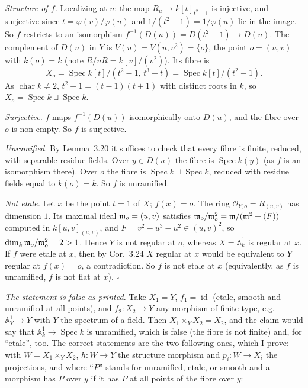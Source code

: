 \documentclass[11pt]{article}
\begin{document}
\emph{Structure of $f$.} Localizing at $u$: the map $R_u\to k[t]_{t^2-1}$ is injective, and surjective since $t=\varphi(v)/\varphi(u)$ and $1/(t^2-1)=1/\varphi(u)$ lie in the image. So $f$ restricts to an isomorphism $f^{-1}(D(u))=D(t^2-1)\to D(u)$. The complement of $D(u)$ in $Y$ is $V(u)=V(u,v^2)=\{o\}$, the point $o=(u,v)$ with $k(o)=k$ (note $R/uR=k[v]/(v^2)$). Its fibre is
\[ X_o=\operatorname{Spec}k[t]/(t^2-1,\,t^3-t)=\operatorname{Spec}k[t]/(t^2-1). \]
As $\operatorname{char}k\ne2$, $t^2-1=(t-1)(t+1)$ with distinct roots in $k$, so $X_o=\operatorname{Spec}k\sqcup\operatorname{Spec}k$.

\emph{Surjective.} $f$ maps $f^{-1}(D(u))$ isomorphically onto $D(u)$, and the fibre over $o$ is non-empty. So $f$ is surjective.

\emph{Unramified.} By Lemma~3.20 it suffices to check that every fibre is finite, reduced, with separable residue fields. Over $y\in D(u)$ the fibre is $\operatorname{Spec}k(y)$ (as $f$ is an isomorphism there). Over $o$ the fibre is $\operatorname{Spec}k\sqcup\operatorname{Spec}k$, reduced with residue fields equal to $k(o)=k$. So $f$ is unramified.

\emph{Not etale.} Let $x$ be the point $t=1$ of $X$; $f(x)=o$. The ring $\mathcal O_{Y,o}=R_{(u,v)}$ has dimension $1$. Its maximal ideal $\mathfrak m_o=(u,v)$ satisfies $\mathfrak m_o/\mathfrak m_o^2=\mathfrak m/(\mathfrak m^2+(F))$ computed in $k[u,v]_{(u,v)}$, and $F=v^2-u^3-u^2\in(u,v)^2$, so $\dim_k\mathfrak m_o/\mathfrak m_o^2=2>1$. Hence $Y$ is not regular at $o$, whereas $X=\mathbb A^1_k$ is regular at $x$. If $f$ were etale at $x$, then by Cor.~3.24 $X$ regular at $x$ would be equivalent to $Y$ regular at $f(x)=o$, a contradiction. So $f$ is not etale at $x$ (equivalently, as $f$ is unramified, $f$ is not flat at $x$). \hfill$\square$

\pf
\emph{The statement is false as printed.} Take $X_1=Y$, $f_1=\operatorname{id}$ (etale, smooth and unramified at all points), and $f_2:X_2\to Y$ any morphism of finite type, e.g.\ $\mathbb A^1_Y\to Y$ with $Y$ the spectrum of a field. Then $X_1\times_YX_2=X_2$, and the claim would say that $\mathbb A^1_k\to\operatorname{Spec}k$ is unramified, which is false (the fibre is not finite) and, for ``etale'', too. The correct statements are the two following ones, which I prove: with $W=X_1\times_YX_2$, $h:W\to Y$ the structure morphism and $p_i:W\to X_i$ the projections, and where ``$P$'' stands for unramified, etale, or smooth and a morphism has $P$ over $y$ if it has $P$ at all points of the fibre over $y$:
\end{document}
